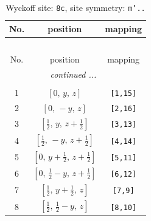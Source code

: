\documentclass[fleqn,8pt]{jsarticle}
\begin{document}
\begin{longtable}{ccc}
\caption{Wyckoff site: {\tt 8c}, site symmetry: {\tt m'..}}
 \\
 \hline \hline
No. & position & mapping \\ \hline \endfirsthead

\multicolumn{2}{l}{\tablename\ \thetable{}} \\
 \hline \hline
No. & position & mapping \\ \hline \endhead

 \hline \hline
\multicolumn{2}{r}{\footnotesize\it continued ...} \\ \endfoot

 \hline \hline
\multicolumn{2}{r}{} \\ \endlastfoot

1 & $\left[ 0,\, y,\, z \right]$ & {\tt [1,15]} \\ \hline
2 & $\left[ 0,\, - y,\, z \right]$ & {\tt [2,16]} \\ \hline
3 & $\left[ \frac{1}{2},\, y,\, z + \frac{1}{2} \right]$ & {\tt [3,13]} \\ \hline
4 & $\left[ \frac{1}{2},\, - y,\, z + \frac{1}{2} \right]$ & {\tt [4,14]} \\ \hline
5 & $\left[ 0,\, y + \frac{1}{2},\, z + \frac{1}{2} \right]$ & {\tt [5,11]} \\ \hline
6 & $\left[ 0,\, \frac{1}{2} - y,\, z + \frac{1}{2} \right]$ & {\tt [6,12]} \\ \hline
7 & $\left[ \frac{1}{2},\, y + \frac{1}{2},\, z \right]$ & {\tt [7,9]} \\ \hline
8 & $\left[ \frac{1}{2},\, \frac{1}{2} - y,\, z \right]$ & {\tt [8,10]} \\
\end{longtable}
\renewcommand{\arraystretch}{1.2}
\end{document}
